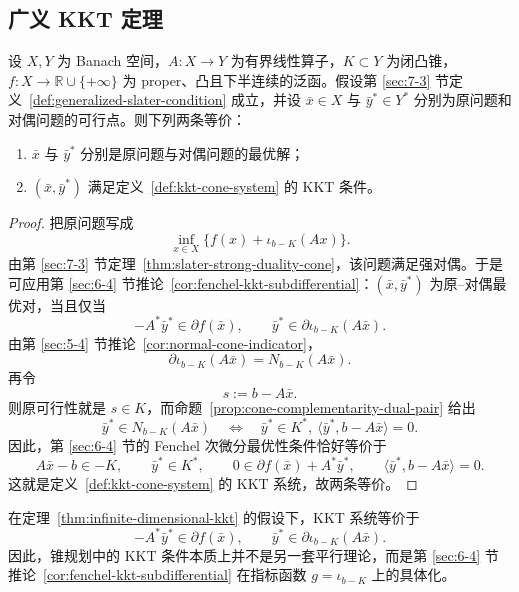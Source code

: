 \subsection{广义 KKT 定理}

\begin{theorem}\label{thm:infinite-dimensional-kkt}
设 $X,Y$ 为 Banach 空间，$A\colon X\to Y$ 为有界线性算子，$K\subset Y$ 为闭凸锥，$f\colon X\to \mathbb R\cup\{+\infty\}$ 为 proper、凸且下半连续的泛函。假设第 \ref{sec:7-3} 节定义~\ref{def:generalized-slater-condition} 成立，并设 $\bar x\in X$ 与 $\bar y^\ast\in Y^\ast$ 分别为原问题和对偶问题的可行点。则下列两条等价：
\begin{enumerate}
  \item $\bar x$ 与 $\bar y^\ast$ 分别是原问题与对偶问题的最优解；
  \item $(\bar x,\bar y^\ast)$ 满足定义~\ref{def:kkt-cone-system} 的 KKT 条件。
\end{enumerate}
\end{theorem}

\begin{proof}
把原问题写成
\[
\inf_{x\in X}\{f(x)+\iota_{b-K}(Ax)\}.
\]
由第 \ref{sec:7-3} 节定理~\ref{thm:slater-strong-duality-cone}，该问题满足强对偶。于是可应用第 \ref{sec:6-4} 节推论~\ref{cor:fenchel-kkt-subdifferential}：$(\bar x,\bar y^\ast)$ 为原--对偶最优对，当且仅当
\[
-A^\ast \bar y^\ast\in \partial f(\bar x),
\qquad
\bar y^\ast\in \partial \iota_{b-K}(A\bar x).
\]
由第 \ref{sec:5-4} 节推论~\ref{cor:normal-cone-indicator}，
\[
\partial \iota_{b-K}(A\bar x)=N_{b-K}(A\bar x).
\]
再令
\[
s:=b-A\bar x.
\]
则原可行性就是 $s\in K$，而命题~\ref{prop:cone-complementarity-dual-pair} 给出
\[
\bar y^\ast\in N_{b-K}(A\bar x)
\quad \Longleftrightarrow \quad
\bar y^\ast\in K^\ast,\ \langle \bar y^\ast,b-A\bar x\rangle=0.
\]
因此，第 \ref{sec:6-4} 节的 Fenchel 次微分最优性条件恰好等价于
\[
A\bar x-b\in -K,\qquad
\bar y^\ast\in K^\ast,\qquad
0\in \partial f(\bar x)+A^\ast \bar y^\ast,\qquad
\langle \bar y^\ast,b-A\bar x\rangle=0.
\]
这就是定义~\ref{def:kkt-cone-system} 的 KKT 系统，故两条等价。
\end{proof}

\begin{corollary}\label{cor:kkt-via-fenchel-subdifferential}
在定理~\ref{thm:infinite-dimensional-kkt} 的假设下，KKT 系统等价于
\[
-A^\ast \bar y^\ast\in \partial f(\bar x),
\qquad
\bar y^\ast\in \partial \iota_{b-K}(A\bar x).
\]
因此，锥规划中的 KKT 条件本质上并不是另一套平行理论，而是第 \ref{sec:6-4} 节推论~\ref{cor:fenchel-kkt-subdifferential} 在指标函数 $g=\iota_{b-K}$ 上的具体化。
\end{corollary}

